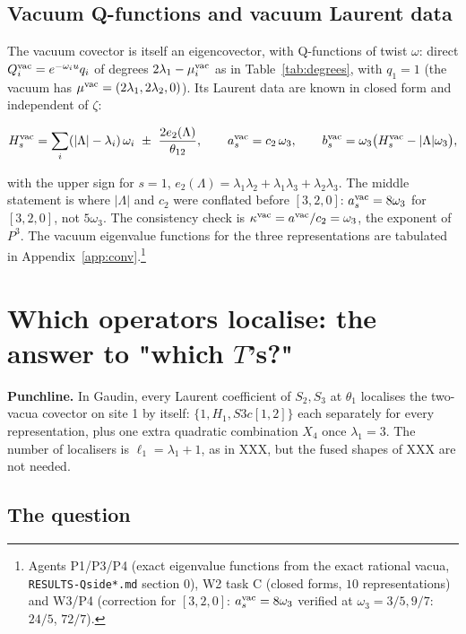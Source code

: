\documentclass[11pt]{article}
\begin{document}
\subsection{Vacuum Q-functions and vacuum Laurent data}\label{sec:vacQ}

The vacuum covector is itself an eigencovector, with Q-functions of twist $\omega$: direct $Q_i^{\rm vac}=e^{-\omega_iu}q_i$ of degrees $2\lambda_1-\mu^{\rm vac}_i$ as in Table~\ref{tab:degrees}, with $q_1=1$ (the vacuum has $\mu^{\rm vac}=(2\lambda_1,2\lambda_2,0)$).
Its Laurent data are known in closed form and independent of $\zeta$:

\begin{equation}
H_s^{\rm vac}=\sum_i(|\Lambda|-\lambda_i)\,\omega_i\ \pm\ \frac{2e_2(\Lambda)}{\theta_{12}},\qquad a_s^{\rm vac}=c_2\,\omega_3,\qquad b_s^{\rm vac}=\omega_3\bigl(H_s^{\rm vac}-|\Lambda|\omega_3\bigr),\label{eq:vacdata}
\end{equation}

with the upper sign for $s=1$, $e_2(\Lambda)=\lambda_1\lambda_2+\lambda_1\lambda_3+\lambda_2\lambda_3$. The middle statement is where $|\Lambda|$ and $c_2$ were conflated before $[3,2,0]$: $a^{\rm vac}_s=8\omega_3$ for $[3,2,0]$, not $5\omega_3$. The consistency check is $\kappa^{\rm vac}=a^{\rm vac}/c_2=\omega_3$, the exponent of $P^3$. The vacuum eigenvalue functions for the three representations are tabulated in Appendix~\ref{app:conv}.\footnote{Agents P1/P3/P4 (exact eigenvalue functions from the exact rational vacua, \texttt{RESULTS-\allowbreak{}Qside*.\allowbreak{}md} section 0), W2 task C (closed forms, $10$ representations) and W3/P4 (correction for $[3,2,0]$: $a_s^{\rm vac}=8\omega_3$ verified at $\omega_3=3/5,9/7$: $24/5$, $72/7$).}

\section{Which operators localise: the answer to "which \texorpdfstring{$T$}{T}'s?"}\label{sec:localise}

\textbf{Punchline.} In Gaudin, every Laurent coefficient of $S_2,S_3$ at $\theta_1$ localises the two-vacua covector on site 1 by itself: $\{1,H_1,S3c[1,2]\}$ each separately for every representation, plus one extra quadratic combination $X_4$ once $\lambda_1=3$. The number of localisers is $\ell_1=\lambda_1+1$, as in XXX, but the fused shapes of XXX are not needed.

\subsection{The question}\label{sec:Tq}
\end{document}
